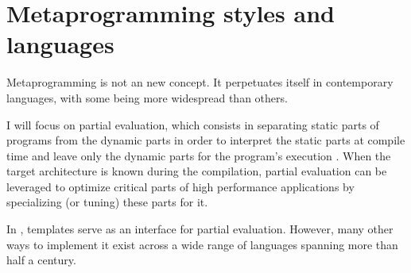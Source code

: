 \documentclass[../main]{subfiles}
\begin{document}
\section{
  Metaprogramming styles and languages
}
\label{lbl:meta-styles-languages}

Metaprogramming is not an new concept. It perpetuates itself in contemporary
languages, with some being more widespread than others.

I will focus on partial evaluation, which consists in separating
static parts of programs from the dynamic parts in order to interpret
the static parts at compile time and leave only the dynamic parts for the
program's execution \cite{10.1145/243439.243447, 10.1023/A:1010095604496}.
When the target architecture is known during the compilation, partial evaluation
can be leveraged to optimize critical parts of high performance applications
by specializing (or tuning) these parts for it.

In \cpp, templates serve as an interface for partial evaluation.
However, many other ways to implement it exist across a wide range of languages
spanning more than half a century.
\end{document}

